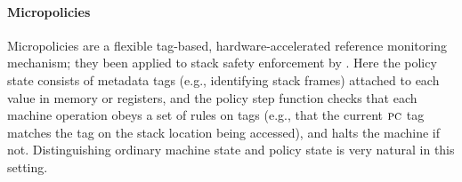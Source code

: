 \documentclass[acmsmall,review,anonymous]{acmart}\settopmatter{printfolios=true,printccs=false,printacmref=false}
\begin{document}
\paragraph*{Micropolicies}
%
Micropolicies are a flexible tag-based, hardware-accelerated
reference monitoring mechanism; they been applied to stack safety
enforcement by \citet{DBLP:conf/sp/RoesslerD18}.
Here the policy state consists of metadata tags (e.g., identifying stack frames)
attached to each value in memory or registers, and the policy step
function checks that each machine operation obeys a set of rules on tags
(e.g., that the current $\textsc{pc}$ tag matches the tag on the stack
location being accessed), and halts the machine if not.  Distinguishing
ordinary machine state and policy state is very natural in this setting.


\ifaftersubmission{}\fi


\end{document}
